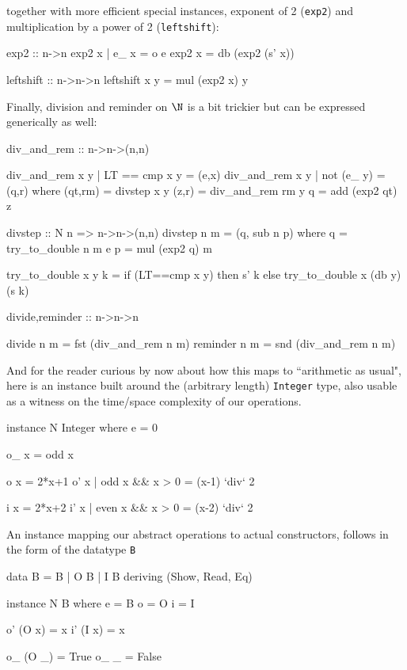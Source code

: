 \documentclass{TOOLS/llncs}
\begin{document}
together with more efficient special instances,
exponent of 2 ({\tt exp2}) and multiplication by a power of 2
({\tt leftshift}):
\begin{code}
  exp2 :: n->n
  exp2 x | e_ x = o e
  exp2 x = db (exp2 (s' x)) 
  
  leftshift :: n->n->n
  leftshift x y = mul (exp2 x) y
\end{code}
Finally, division and reminder on $\N$ is a bit trickier but
can be expressed generically as well:
\begin{code}
  div_and_rem :: n->n->(n,n)
  
  div_and_rem x y | LT == cmp x y = (e,x)
  div_and_rem x y | not (e_ y) = (q,r) where 
    (qt,rm) = divstep x y
    (z,r) = div_and_rem rm y
    q = add (exp2 qt) z
    
    divstep :: N n => n->n->(n,n)
    divstep n m = (q, sub n p) where
      q = try_to_double n m e
      p = mul (exp2 q) m    
    
      try_to_double x y k = 
        if (LT==cmp x y) 
          then s' k
          else try_to_double x (db y) (s k)   
          
  divide,reminder :: n->n->n
  
  divide n m = fst (div_and_rem n m)
  reminder n m = snd (div_and_rem n m)
\end{code}

And for the reader curious by now about how this maps to ``arithmetic as
usual", here is an instance built around 
the (arbitrary length) {\tt Integer}
type, also usable as a witness on the time/space complexity 
of our operations.
\begin{code}
instance N Integer where
  e = 0
  
  o_ x = odd x
  
  o  x = 2*x+1
  o' x | odd x && x >  0 = (x-1) `div` 2
  
  i  x = 2*x+2
  i' x | even x && x > 0 = (x-2) `div` 2
\end{code}
An instance mapping our abstract operations to actual constructors,
follows in the form of the datatype {\tt B}
\begin{code}
data B = B | O B | I B deriving (Show, Read, Eq)

instance N B where
  e = B
  o = O
  i = I
  
  o' (O x) = x
  i' (I x) = x
  
  o_ (O _) = True
  o_ _ = False
  

\end{code}
\end{document}
